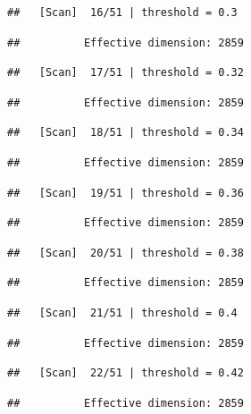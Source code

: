 \documentclass[
]{book}
\begin{document}
\begin{verbatim}
##   [Scan]  16/51 | threshold = 0.3
\end{verbatim}

\begin{verbatim}
##          Effective dimension: 2859
\end{verbatim}

\begin{verbatim}
##   [Scan]  17/51 | threshold = 0.32
\end{verbatim}

\begin{verbatim}
##          Effective dimension: 2859
\end{verbatim}

\begin{verbatim}
##   [Scan]  18/51 | threshold = 0.34
\end{verbatim}

\begin{verbatim}
##          Effective dimension: 2859
\end{verbatim}

\begin{verbatim}
##   [Scan]  19/51 | threshold = 0.36
\end{verbatim}

\begin{verbatim}
##          Effective dimension: 2859
\end{verbatim}

\begin{verbatim}
##   [Scan]  20/51 | threshold = 0.38
\end{verbatim}

\begin{verbatim}
##          Effective dimension: 2859
\end{verbatim}

\begin{verbatim}
##   [Scan]  21/51 | threshold = 0.4
\end{verbatim}

\begin{verbatim}
##          Effective dimension: 2859
\end{verbatim}

\begin{verbatim}
##   [Scan]  22/51 | threshold = 0.42
\end{verbatim}

\begin{verbatim}
##          Effective dimension: 2859
\end{verbatim}
\end{document}
